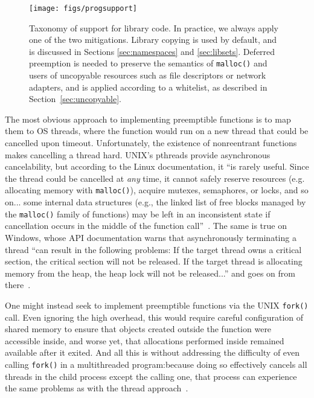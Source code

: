 \begin{figure}
\texttt{[image: figs/progsupport]}
\label{fig:progsupport}
\caption{Taxonomy of support for library code.  \textnormal{In practice, we always
apply one of the two mitigations.  Library copying is used by default, and is
discussed in Sections \ref{sec:namespaces} and \ref{sec:libsets}.  Deferred
preemption is needed to preserve the semantics of \texttt{malloc()} and users of
uncopyable resources such as file descriptors or network adapters, and is applied
according to a whitelist, as described in Section~\ref{sec:uncopyable}.}}
\label{fig:progsupport}
\end{figure}

The most obvious approach to implementing preemptible functions is to map them to
OS threads, where the function would run on a new thread that
could be cancelled upon timeout.  Unfortunately, the existence of nonreentrant
functions makes cancelling a thread hard.  UNIX's pthreads provide
asynchronous cancelability, but according to the Linux documentation, it ``is rarely
useful.  Since the thread could be cancelled at \textit{any} time, it cannot safely
reserve resources (e.g.  allocating memory with \texttt{malloc()}), acquire mutexes,
semaphores, or locks, and so on... some internal data structures (e.g., the linked
list of free blocks managed by the \texttt{malloc()} family of functions) may be left
in an inconsistent state if cancellation occurs in the middle of the function
call''~\cite{pthreadsetcanceltype-manpage}.  The same is true on Windows, whose API
documentation warns that asynchronously terminating a thread ``can result in the
following problems: If the target thread owns a critical section, the critical
section will not be released.  If the target thread is allocating memory from the
heap, the heap lock will not be released...'' and goes on from
there~\cite{www-microsoft-terminatethread}.

One might instead seek to implement preemptible functions via the UNIX
\texttt{fork()} call.  Even ignoring the high overhead, this would require
careful configuration of shared memory
to ensure that objects created outside the function were accessible inside, and worse
yet, that allocations performed inside remained available after it exited.
And all this is
without addressing the difficulty of even calling \texttt{fork()} in a multithreaded
program:\@ because doing so effectively cancels all threads in the child process
except the calling one, that process can experience the same problems as with the
thread approach~\cite{baumann:hotos2019}.

